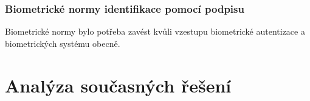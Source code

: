 

\subsection{Biometrické normy identifikace pomocí podpisu}
Biometrické normy bylo potřeba zavést kvůli vzestupu biometrické autentizace a biometrických systému obecně.


\chapter{Analýza současných řešení}


